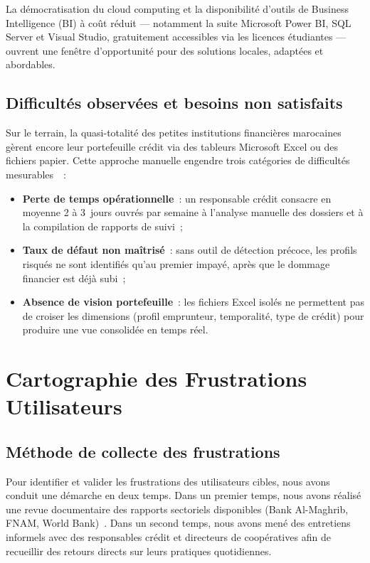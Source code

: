 \documentclass[12pt, a4paper]{report}
\begin{document}
La démocratisation du cloud computing et la disponibilité d'outils de Business
Intelligence (BI) à coût réduit --- notamment la suite Microsoft Power BI, SQL Server
et Visual Studio, gratuitement accessibles via les licences étudiantes --- ouvrent
une fenêtre d'opportunité pour des solutions locales, adaptées et abordables.

\subsection{Difficultés observées et besoins non satisfaits}

Sur le terrain, la quasi-totalité des petites institutions financières marocaines
gèrent encore leur portefeuille crédit via des tableurs Microsoft Excel ou des
fichiers papier. Cette approche manuelle engendre trois catégories de difficultés
mesurables~\cite{prototype_slides}~:

\begin{itemize}[leftmargin=1.5em]
  \item \textbf{Perte de temps opérationnelle}~: un responsable crédit consacre en
    moyenne 2 à 3~jours ouvrés par semaine à l'analyse manuelle des dossiers et à la
    compilation de rapports de suivi~;
  \item \textbf{Taux de défaut non maîtrisé}~: sans outil de détection précoce, les
    profils risqués ne sont identifiés qu'au premier impayé, après que le dommage
    financier est déjà subi~;
  \item \textbf{Absence de vision portefeuille}~: les fichiers Excel isolés ne
    permettent pas de croiser les dimensions (profil emprunteur, temporalité, type de
    crédit) pour produire une vue consolidée en temps réel.
\end{itemize}

\section{Cartographie des Frustrations Utilisateurs}

\subsection{Méthode de collecte des frustrations}

Pour identifier et valider les frustrations des utilisateurs cibles, nous avons
conduit une démarche en deux temps. Dans un premier temps, nous avons réalisé
une revue documentaire des rapports sectoriels disponibles (Bank Al-Maghrib,
FNAM, World Bank)~\cite{bam_rapport,fnam,worldbank}. Dans un second temps, nous
avons mené des entretiens informels avec des responsables crédit et directeurs de
coopératives afin de recueillir des retours directs sur leurs pratiques quotidiennes.
\end{document}
